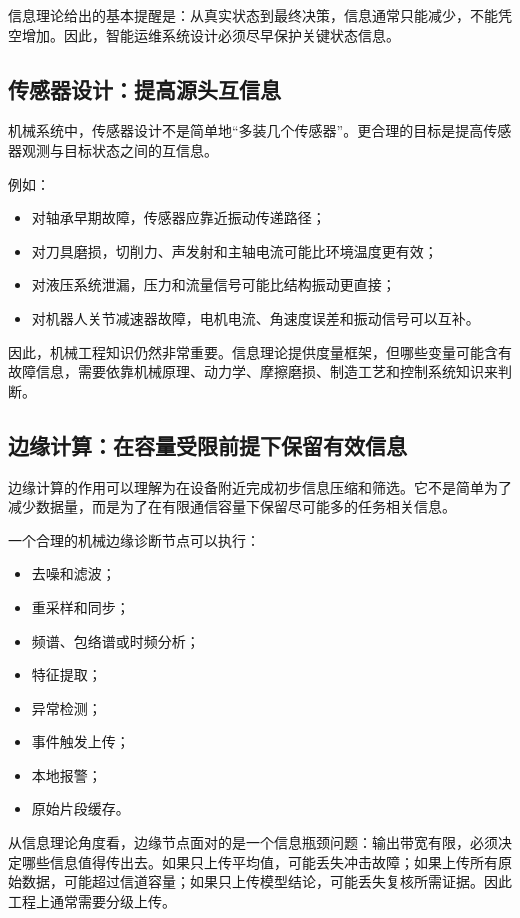 \documentclass[UTF8,a4paper,12pt]{ctexart}
\begin{document}
信息理论给出的基本提醒是：从真实状态到最终决策，信息通常只能减少，不能凭空增加。因此，智能运维系统设计必须尽早保护关键状态信息。

\subsection{传感器设计：提高源头互信息}

机械系统中，传感器设计不是简单地“多装几个传感器”。更合理的目标是提高传感器观测与目标状态之间的互信息。

例如：
\begin{itemize}
  \item 对轴承早期故障，传感器应靠近振动传递路径；
  \item 对刀具磨损，切削力、声发射和主轴电流可能比环境温度更有效；
  \item 对液压系统泄漏，压力和流量信号可能比结构振动更直接；
  \item 对机器人关节减速器故障，电机电流、角速度误差和振动信号可以互补。
\end{itemize}

因此，机械工程知识仍然非常重要。信息理论提供度量框架，但哪些变量可能含有故障信息，需要依靠机械原理、动力学、摩擦磨损、制造工艺和控制系统知识来判断。

\subsection{边缘计算：在容量受限前提下保留有效信息}

边缘计算的作用可以理解为在设备附近完成初步信息压缩和筛选。它不是简单为了减少数据量，而是为了在有限通信容量下保留尽可能多的任务相关信息。

一个合理的机械边缘诊断节点可以执行：
\begin{itemize}
  \item 去噪和滤波；
  \item 重采样和同步；
  \item 频谱、包络谱或时频分析；
  \item 特征提取；
  \item 异常检测；
  \item 事件触发上传；
  \item 本地报警；
  \item 原始片段缓存。
\end{itemize}

从信息理论角度看，边缘节点面对的是一个信息瓶颈问题：输出带宽有限，必须决定哪些信息值得传出去。如果只上传平均值，可能丢失冲击故障；如果上传所有原始数据，可能超过信道容量；如果只上传模型结论，可能丢失复核所需证据。因此工程上通常需要分级上传。
\end{document}
